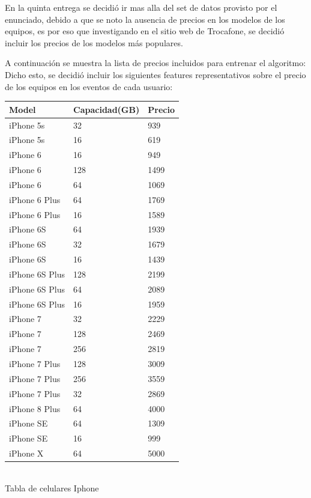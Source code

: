 \documentclass[a4paper ,12pt]{article}
\begin{document}
En la quinta entrega se decidió ir mas alla del set de datos provisto por el enunciado, debido a que se noto la ausencia de precios en 
los modelos de los equipos, es por eso que investigando en el sitio web de Trocafone, se decidió incluir los precios de los modelos más populares.

A continuación se muestra la lista de precios incluidos para entrenar el algoritmo:
Dicho esto, se decidió incluir los siguientes features representativos sobre el precio de los equipos en los eventos de cada usuario:

\begin{center}
	 	
		\begin{tabular}{lll}
			\hline
			Model&Capacidad(GB)&Precio \\
			\hline

			iPhone 5s&32&939 \\
			iPhone 5s&16&619 \\
			iPhone 6&16&949 \\
			iPhone 6&128&1499 \\
			iPhone 6&64&1069 \\
			iPhone 6 Plus&64&1769 \\
			iPhone 6 Plus&16&1589 \\
			iPhone 6S&64&1939\\
			iPhone 6S&32&1679\\
			iPhone 6S&16&1439\\
			iPhone 6S Plus&128&2199 \\
			iPhone 6S Plus&64&2089 \\
			iPhone 6S Plus&16&1959 \\
			iPhone 7&32&2229\\
			iPhone 7&128&2469\\
			iPhone 7&256&2819\\
			iPhone 7 Plus&128&3009 \\
			iPhone 7 Plus&256&3559 \\
			iPhone 7 Plus&32&2869 \\
			iPhone 8 Plus&64&4000 \\
			iPhone SE&64&1309 \\
			iPhone SE&16&999 \\
			iPhone X&64&5000 \\
			
		\hline
		\end{tabular}
	\\
	
	Tabla de celulares Iphone
\end{center}
\end{document}
